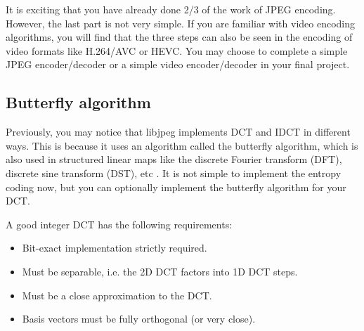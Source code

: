 \documentclass[a4paper,12pt,twoside]{article}
\begin{document}
It is exciting that you have already done 2/3 of the work of JPEG encoding. However, the last part is not very simple. If you are familiar with video encoding algorithms, you will find that the three steps can also be seen in the encoding of video formats like H.264/AVC or HEVC. You may choose to complete a simple JPEG encoder/decoder or a simple video encoder/decoder in your final project.
\subsection{Butterfly algorithm}
Previously, you may notice that libjpeg implements DCT and IDCT in different ways. This is because it uses an algorithm called the butterfly algorithm, which is also used in structured linear maps like the discrete Fourier transform (DFT), discrete sine transform (DST), etc \cite{butterfly}. It is not simple to implement the entropy coding now, but you can optionally implement the butterfly algorithm for your DCT.

A good integer DCT has the following requirements:
\begin{itemize}
    \item Bit-exact implementation strictly required.
    \item Must be separable, i.e. the 2D DCT factors into 1D DCT steps.
    \item Must be a close approximation to the DCT.
    \item Basis vectors must be fully orthogonal (or very close).
\end{itemize}
\end{document}
